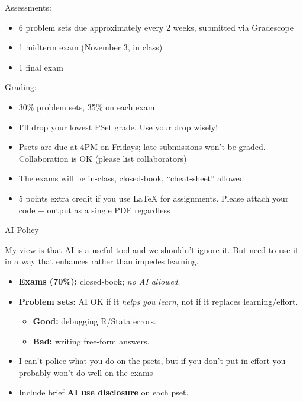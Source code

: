 \documentclass[11pt,english,handout]{beamer}
\begin{document}
\begin{frame}
\vspace{0.1cm}
Assessments:
\begin{itemize}
\item 6 problem sets due approximately every 2 weeks, submitted via Gradescope
\item 1 midterm exam (November 3, in class)
\item 1 final exam
\vspace{0.1cm}

\end{itemize}
\vspace{0.2cm}

\pause{}

Grading:

\begin{itemize}
\item 30\% problem sets, 35\%  on each exam.
\vspace{0.1cm}
\item
 I'll drop your lowest PSet grade. Use your drop wisely!
\vspace{0.1cm}
\item Psets are due at 4PM on Fridays; late submissions won't be graded.  Collaboration is OK (please list collaborators)
\vspace{0.1cm}
\item The exams will be in-class, closed-book, ``cheat-sheet'' allowed
\vspace{0.1cm}
\item 5 points extra credit if you use LaTeX for assignments. Please attach your code + output as a single PDF regardless
\end{itemize}
\vspace{0.2cm}

\end{frame}

\begin{frame}{AI Policy}

My view is that AI is a useful tool and we shouldn't ignore it. But need to use it in a way that enhances rather than impedes learning. \medskip
	
	\begin{itemize}
		\item \textbf{Exams (70\%):} closed-book; \emph{no AI allowed}.
		\item \textbf{Problem sets:} AI OK if it \emph{helps you learn}, not if it replaces learning/effort.
		\begin{itemize}
			\item \textbf{Good:} debugging R/Stata errors.
			\item \textbf{Bad:} writing free-form answers.
		\end{itemize}
		\item I can't police what you do on the psets, but if you don't put in effort you probably won't do well on the exams
		\item Include brief \textbf{AI use disclosure} on each pset.
	\end{itemize}
	
\end{frame}
\end{document}
